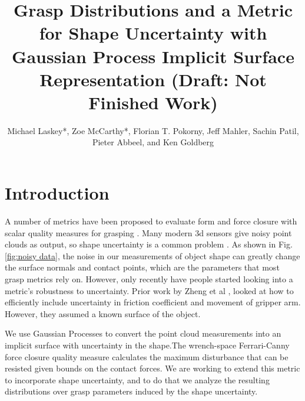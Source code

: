 \documentclass[letterpaper, 10 pt, conference]{ieeeconf}  %
\title{\LARGE \bf
Grasp Distributions and a Metric for Shape Uncertainty with Gaussian Process Implicit Surface Representation (Draft: Not Finished Work) }
\author{Michael Laskey*, Zoe McCarthy*, Florian T. Pokorny, Jeff Mahler, Sachin Patil, Pieter Abbeel, and Ken Goldberg}%
\begin{document}
\maketitle
\thispagestyle{empty}
\pagestyle{empty}





\section{Introduction}

\vspace{10pt}
 A number of metrics have been proposed to evaluate form and force closure with scalar quality measures for grasping \cite{bicchi2000}.  Many modern 3d sensors give noisy point clouds as output, so shape uncertainty is a common problem \cite{singhbigbird}. As shown in Fig. \ref{fig:noisy data}, the noise in our measurements of object shape can greatly change the surface normals and contact points, which are the parameters that most grasp metrics rely on.  However, only recently have people started looking into a metric's robustness to uncertainty. Prior work by Zheng et al \cite{zheng2005}, looked at how to efficiently include uncertainty in friction coefficient and movement of gripper arm. However, they assumed a known surface of the object.
 
We use Gaussian Processes \cite{rasmussen2006} to convert the point cloud measurements into an implicit surface with uncertainty in the shape.The wrench-space Ferrari-Canny force closure quality measure \cite{ferrari1992} calculates the maximum disturbance that can be resisted given bounds on the contact forces.
We are working to extend this metric to incorporate shape uncertainty, and to do that we analyze the resulting distributions over grasp parameters induced by the shape uncertainty. 
\end{document}
